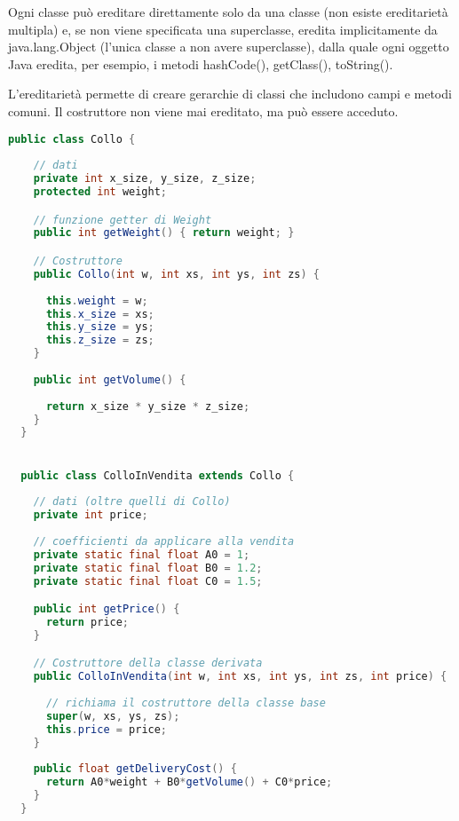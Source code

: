 \documentclass[a4paper,12pt,twoside]{book}
\begin{document}
Ogni classe può ereditare direttamente solo da una classe (non esiste
ereditarietà multipla) e, se non viene specificata una superclasse,
eredita implicitamente da java.lang.Object (l’unica classe a non avere
superclasse), dalla quale ogni oggetto Java eredita, per esempio, i
metodi hashCode(), getClass(), toString().

L’ereditarietà permette di creare gerarchie di classi che includono
campi e metodi comuni. Il costruttore non viene mai ereditato, ma può
essere acceduto.

\begin{lstlisting}[caption={Un esempio di ereditarietà nel quale intendiamo dare una bozza di modello per un generico magazzino in cui parte dei colli sono per la vendita},
  label={lst:Ereditarieta},language=Java]
  public class Collo {
    
    // dati
    private int x_size, y_size, z_size;
    protected int weight;

    // funzione getter di Weight
    public int getWeight() { return weight; }

    // Costruttore
    public Collo(int w, int xs, int ys, int zs) {
      
      this.weight = w;
      this.x_size = xs;
      this.y_size = ys;
      this.z_size = zs;
    }
    
    public int getVolume() {
      
      return x_size * y_size * z_size;
    }
  }


  public class ColloInVendita extends Collo {
    
    // dati (oltre quelli di Collo)
    private int price;
    
    // coefficienti da applicare alla vendita
    private static final float A0 = 1;   
    private static final float B0 = 1.2; 
    private static final float C0 = 1.5; 

    public int getPrice() {
      return price;
    }

    // Costruttore della classe derivata
    public ColloInVendita(int w, int xs, int ys, int zs, int price) {
      
      // richiama il costruttore della classe base
      super(w, xs, ys, zs); 
      this.price = price;
    }
    
    public float getDeliveryCost() {
      return A0*weight + B0*getVolume() + C0*price;
    }
  }

\end{lstlisting}
\end{document}
